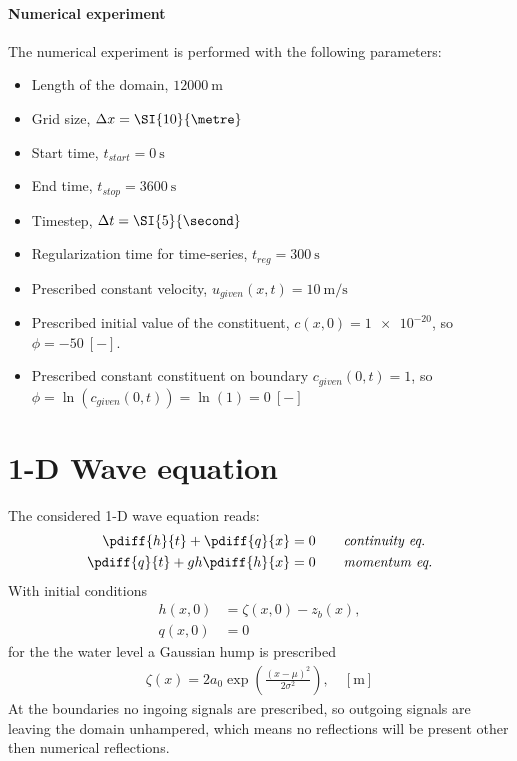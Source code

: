 \paragraph*{Numerical experiment}
The numerical experiment is performed with the following parameters:
\begin{itemize}
    \item Length of the domain, $\SI{12000}{\metre}$
    \item Grid size, $\Dx = \SI{10}{\metre}$
    \item Start time, $t_{start} = \SI{0}{\second}$
    \item End time, $t_{stop} = \SI{3600}{\second}$
    \item Timestep, $\Dt = \SI{5}{\second}$
    \item Regularization time for time-series, $t_{reg} = \SI{300}{\second}$
    \item Prescribed constant velocity, $u_{given}(x,t) = \SI{10}{\metre\per\second}$
    \item Prescribed initial value of the constituent, $c(x,0)= \num{1e-20}$, \newline so $\phi = \SI{-50}{[-]}$.
    \item Prescribed constant constituent on boundary $c_{given}(0,t) = 1$, \newline so $\phi = \ln(c_{given}(0,t)) = \ln(1) = \SI{0}{[-]}$
\end{itemize}
\section{1-D Wave equation}
The considered 1-D wave equation reads:
\begin{align}
    \pdiff{h}{t}  + \pdiff{q}{x} & = 0 \qquad \textit{continuity eq.} \\
    \pdiff{q}{t}  + g h \pdiff{h}{x} & = 0 \qquad \textit{momentum eq.}
\end{align}
With initial conditions
\begin{align}
    h(x,0) & = \zeta(x,0) - z_b(x),\\
    q(x,0) & = 0
\end{align}
for the the water level a Gaussian hump is prescribed
\begin{align}
    \zeta(x) = 2 a_0 \exp\left( \frac{(x - \mu)^2}{2\sigma^2}  \right), \quad [\si{\metre}]
\end{align}
At the boundaries no ingoing signals are prescribed, so outgoing signals are leaving the domain unhampered, which means no reflections will be present other then numerical reflections.

